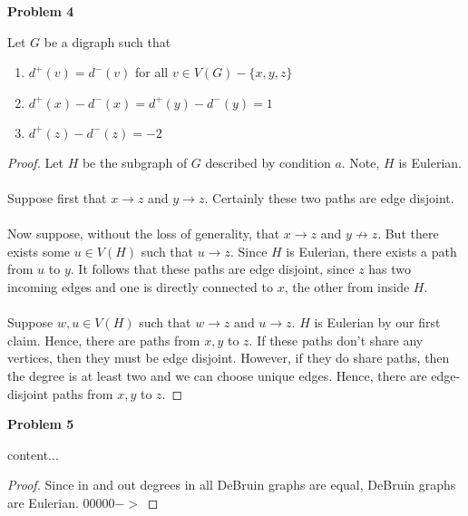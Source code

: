 \documentclass{article}
\newenvironment{claim}[2][Claim]{\begin{trivlist}
		\item[\hskip \labelsep {\bfseries #1}\hskip \labelsep {\bfseries #2}]}{\end{trivlist}}
\begin{document}
\noindent \textbf{Problem 4}
\begin{claim}{}
	Let $G$ be a digraph such that 
	\begin{enumerate}[label=\alph*)]
		\item $d^+(v) = d^-(v)$ for all $v \in V(G) - \{ x,y,z\}$ 
		\item $d^+(x) - d^-(x) = d^+(y) - d^-(y) = 1$
		\item $d^+(z) - d^-(z) = -2$
	\end{enumerate}

\end{claim}
\begin{proof}
	Let $H$ be the subgraph of $G$ described by condition $a$. Note, $H$ is Eulerian. \\ \\
	Suppose first that $x \rightarrow z$ and $y \rightarrow z$. Certainly these two paths are edge disjoint. \\ \\
	Now suppose, without the loss of generality, that $x \rightarrow z$ and $y \not \rightarrow z$. But there exists some $u \in V(H)$ such that $u \rightarrow z$. Since $H$ is Eulerian, there exists a path from $u$ to $y$. It follows that these paths are edge disjoint, since $z$ has two incoming edges and one is directly connected to $x$, the other from inside $H$.\\\\
	Suppose $w,u \in V(H)$ such that $w \rightarrow z$ and $u \rightarrow z$. $H$ is Eulerian by our first claim. Hence, there are paths from $x,y$ to $z$. If these paths don't share any vertices, then they must be edge disjoint. However, if they do share paths, then the degree is at least two and we can choose unique edges. Hence, there are edge-disjoint paths from $x,y$ to $z$.
\end{proof}

\noindent \textbf{Problem 5}
\begin{claim}{}
	content...
\end{claim}
\begin{proof}
	Since in and out degrees in all DeBruin graphs are equal, DeBruin graphs are Eulerian.
	$00000 ->$
\end{proof}
\end{document}
